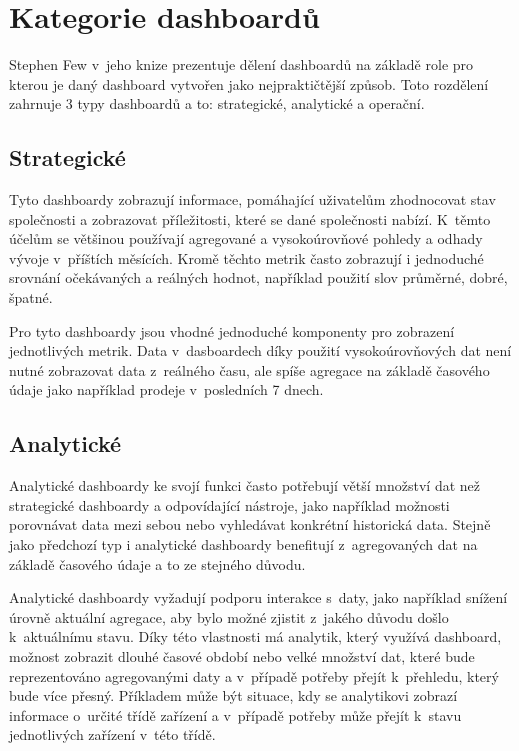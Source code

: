 \section{Kategorie dashboardů}
Stephen Few v~jeho knize \cite{few2013information} prezentuje dělení dashboardů na základě role pro kterou je daný dashboard vytvořen jako nejpraktičtější způsob. Toto rozdělení zahrnuje 3 typy dashboardů a to: strategické, analytické a operační.

\subsection{Strategické}
Tyto dashboardy zobrazují informace, pomáhající uživatelům zhodnocovat stav společnosti a zobrazovat příležitosti, které se dané společnosti nabízí. K~těmto účelům se většinou používají agregované a vysokoúrovňové pohledy a odhady vývoje v~příštích měsících. Kromě těchto metrik často zobrazují i jednoduché srovnání očekávaných a reálných hodnot, například použití slov průměrné, dobré, špatné.

Pro tyto dashboardy jsou vhodné jednoduché komponenty pro zobrazení jednotlivých metrik. Data v~dasboardech díky použití vysokoúrovňových dat není nutné zobrazovat data z~reálného času, ale spíše agregace na základě časového údaje jako například prodeje v~posledních 7 dnech.

\subsection{Analytické}
\label{analytical_dashboards}
Analytické dashboardy ke svojí funkci často potřebují větší množství dat než strategické dashboardy a odpovídající nástroje, jako například možnosti porovnávat data mezi sebou nebo vyhledávat konkrétní historická data. Stejně jako předchozí typ i analytické dashboardy benefitují z~agregovaných dat na základě časového údaje a to ze stejného důvodu. 

Analytické dashboardy vyžadují podporu interakce s~daty, jako například snížení úrovně aktuální agregace, aby bylo možné zjistit z~jakého důvodu došlo k~aktuálnímu stavu. Díky této vlastnosti má analytik, který využívá dashboard, možnost zobrazit dlouhé časové období nebo velké množství dat, které bude reprezentováno agregovanými daty a v~případě potřeby přejít k~přehledu, který bude více přesný. Příkladem může být situace, kdy se analytikovi zobrazí informace o~určité třídě zařízení a v~případě potřeby může přejít k~stavu jednotlivých zařízení v~této třídě.

